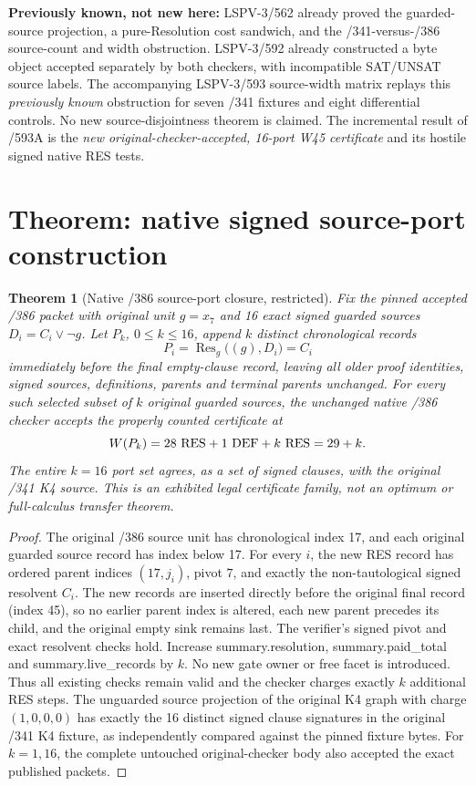 \documentclass[11pt]{article}
\newtheorem{theorem}{Theorem}
\begin{document}
\noindent\textbf{Previously known, not new here:}
LSPV-3/562 already proved the guarded-source projection, a
pure-Resolution cost sandwich, and the /341-versus-/386 source-count
and width obstruction. LSPV-3/592 already constructed a byte object
accepted separately by both checkers, with incompatible SAT/UNSAT
source labels. The accompanying LSPV-3/593 source-width matrix
replays this \emph{previously known} obstruction for seven /341
fixtures and eight differential controls. No new source-disjointness
theorem is claimed. The incremental result of /593A is the
\emph{new original-checker-accepted, 16-port W45 certificate}
and its hostile signed native RES tests.

\section*{Theorem: native signed source-port construction}
\begin{theorem}[Native /386 source-port closure, restricted]
Fix the pinned accepted /386 packet with original unit $g=x_7$
and 16 exact signed guarded sources
$D_i=C_i\vee\neg g$.
Let $P_k$, $0\le k\le16$, append $k$ distinct chronological
records
\[
  P_i=\operatorname{Res}_{g}\bigl((g),D_i\bigr)=C_i
\]
immediately before the final empty-clause record, leaving all older
proof identities, signed sources, definitions, parents and terminal
parents unchanged. For every such selected subset of $k$ original
guarded sources, the unchanged native /386 checker accepts the
properly counted certificate at
\[
  W(P_k)=28\ {\rm RES}+1\ {\rm DEF}+k\ {\rm RES}
        =29+k.
\]
The entire $k=16$ port set agrees, as a set of signed clauses,
with the original /341 K4 source. This is an exhibited
\emph{legal certificate family}, not an optimum or full-calculus
transfer theorem.
\end{theorem}
\begin{proof}
The original /386 source unit has chronological index 17, and each
original guarded source record has index below 17. For every $i$,
the new RES record has ordered parent indices $(17,j_i)$, pivot $7$,
and exactly the non-tautological signed resolvent $C_i$.
The new records are inserted directly before the original final
record (index 45), so no earlier parent index is altered, each
new parent precedes its child, and the original empty sink remains
last. The verifier's signed pivot and exact resolvent checks hold.
Increase summary.resolution, summary.paid\_total and
summary.live\_records by $k$. No new gate owner or free facet is
introduced. Thus all existing checks remain valid and the checker
charges exactly $k$ additional RES steps. The unguarded source
projection of the original K4 graph with charge $(1,0,0,0)$
has exactly the 16 distinct signed clause signatures in the
original /341 K4 fixture, as independently compared against
the pinned fixture bytes. For $k=1,16$, the complete untouched
original-checker body also accepted the exact published packets.
\end{proof}
\end{document}
